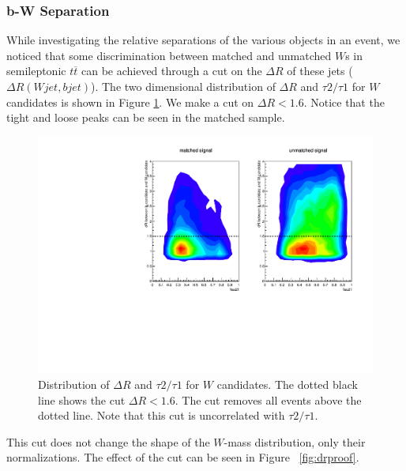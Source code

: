 \subsubsection{b-W Separation}
While investigating the relative separations of the various objects in an event, we noticed that some discrimination between matched and unmatched $W$s in semileptonic $t\overline{t}$ can be achieved through a cut on the $\Delta R$ of these jets ($\Delta R(Wjet, bjet)$). The two dimensional distribution of $\Delta R$ and $\tau 2/\tau 1$ for $W$ candidates is shown in Figure \ref{fig:drcut}. We make a cut on $\Delta R < 1.6$. Notice that the tight and loose peaks can be seen in the matched sample.
\begin{figure}[ht!]
\centering
\includegraphics[scale=0.87]{figs/WtagSF/Z.pdf}
\caption{Distribution of $\Delta R$ and $\tau 2/\tau 1$ for $W$ candidates. The dotted black line shows the cut $\Delta R < 1.6$. The cut removes all events above the dotted line. Note that this cut is uncorrelated with $\tau 2/\tau 1$.}\label{fig:drcut}
\end{figure}
This cut does not change the shape of the $W$-mass distribution, only their normalizations. The effect of the cut can be seen in Figure~ \ref{fig:drproof}.
